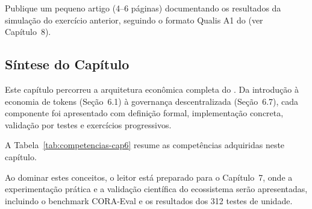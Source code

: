 \begin{exercicio}
Publique um pequeno artigo (4--6 páginas) documentando os
resultados da simulação do exercício anterior, seguindo o
formato Qualis A1 do \opencodeeco{} (ver Capítulo~8).
\end{exercicio}

\subsection{Síntese do Capítulo}

Este capítulo percorreu a arquitetura econômica completa do
\opencodeeco{}. Da introdução à economia de tokens (Seção~6.1)
à governança descentralizada (Seção~6.7), cada componente foi
apresentado com definição formal, implementação concreta,
validação por testes e exercícios progressivos.

A Tabela~\ref{tab:competencias-cap6} resume as competências
adquiridas neste capítulo.

\begin{table}[htb]
\centering
    \small
\caption{Competências adquiridas no Capítulo 6}
\label{tab:competencias-cap6}
\end{table}

Ao dominar estes conceitos, o leitor está preparado para o
Capítulo~7, onde a experimentação prática e a validação
científica do ecossistema serão apresentadas, incluindo o
benchmark CORA-Eval e os resultados dos 312 testes de unidade.

